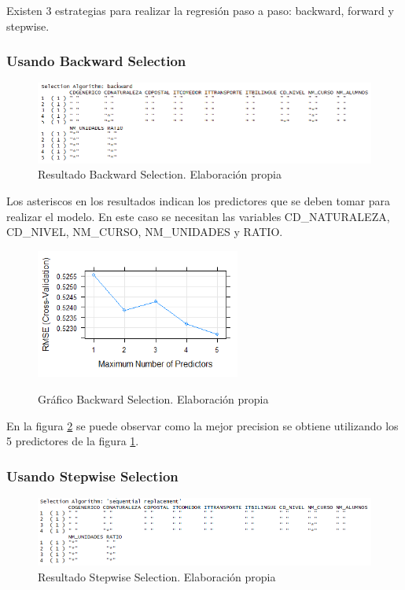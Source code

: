 \begin{subappendices}
Existen 3 estrategias para realizar la regresión paso a paso: backward, forward y stepwise.

\subsubsection{Usando Backward Selection}
\begin{figure}[htb]
	\centering
	\caption{Resultado Backward Selection. Elaboración propia}
	\label{fig:backwardSum}
	\includegraphics[width=1\textwidth]{recursos/ImagenesR/backwardSum}
	
\end{figure}
\FloatBarrier

Los asteriscos en los resultados indican los predictores que se deben tomar para realizar el modelo. En este caso se necesitan las variables CD\_NATURALEZA, CD\_NIVEL, NM\_CURSO, NM\_UNIDADES y RATIO.

\begin{figure}[htb]
	\centering
	\caption{Gráfico Backward Selection. Elaboración propia}
	\includegraphics[width=0.6\textwidth]{recursos/ImagenesR/backward}
	\label{fig:backward}
\end{figure}
\FloatBarrier

En la figura \ref{fig:backward} se puede observar como la mejor precision se obtiene utilizando los 5 predictores de la figura \ref{fig:backwardSum}.

\subsubsection{Usando Stepwise Selection}
\begin{figure}[htb]
	\centering
	\caption{Resultado Stepwise Selection. Elaboración propia}
	\label{fig:seqSum}
	\includegraphics[width=1\textwidth]{recursos/ImagenesR/seqSum}
	

\end{figure}
\end{subappendices}
